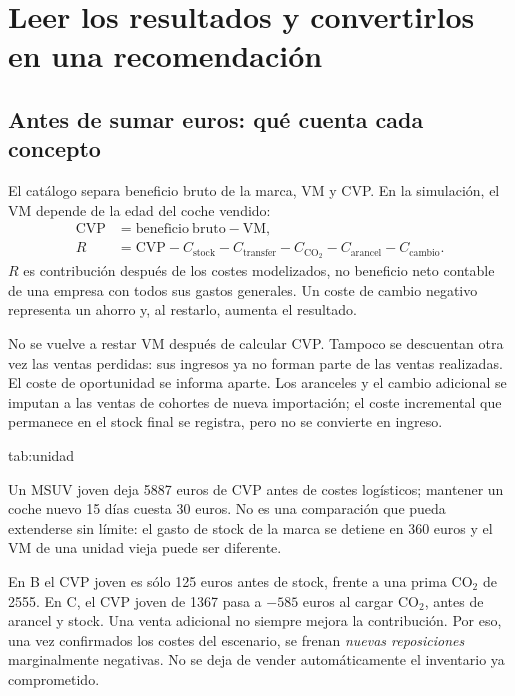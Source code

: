 \section{Leer los resultados y convertirlos en una recomendación}\label{sec:lectura-final}

\subsection{Antes de sumar euros: qué cuenta cada concepto}
El catálogo separa beneficio bruto de la marca, VM y CVP. En la simulación,
el VM depende de la edad del coche vendido:
\begin{align}
 \mathrm{CVP}&=\mathrm{beneficio\ bruto}-\mathrm{VM},\\
 R&=\mathrm{CVP}-C_{\mathrm{stock}}-C_{\mathrm{transfer}}
       -C_{\mathrm{CO_2}}-C_{\mathrm{arancel}}-C_{\mathrm{cambio}}.
\end{align}
$R$ es contribución después de los costes modelizados, no beneficio neto contable
de una empresa con todos sus gastos generales. Un coste de cambio negativo
representa un ahorro y, al restarlo, aumenta el resultado.

No se vuelve a restar VM después de calcular CVP. Tampoco se descuentan otra vez
las ventas perdidas: sus ingresos ya no forman parte de las ventas realizadas.
El coste de oportunidad se informa aparte. Los aranceles y el cambio adicional
se imputan a las ventas de cohortes de nueva importación; el coste incremental
que permanece en el stock final se registra, pero no se convierte en ingreso.

{tab:unidad}{}

Un MSUV joven deja \num{5887} euros de CVP antes de costes logísticos; mantener
un coche nuevo 15 días cuesta 30 euros. No es una comparación que pueda
extenderse sin límite: el gasto de stock de la marca se detiene en 360 euros y
el VM de una unidad vieja puede ser diferente.

En B el CVP joven es sólo 125 euros antes de stock, frente a una prima CO$_2$
de \num{2555}. En C, el CVP joven de \num{1367} pasa a $-585$ euros al cargar
CO$_2$, antes de arancel y stock. Una venta adicional no siempre mejora la
contribución. Por eso, una vez confirmados los costes del escenario, se frenan
\emph{nuevas reposiciones} marginalmente negativas. No se deja de vender
automáticamente el inventario ya comprometido.


